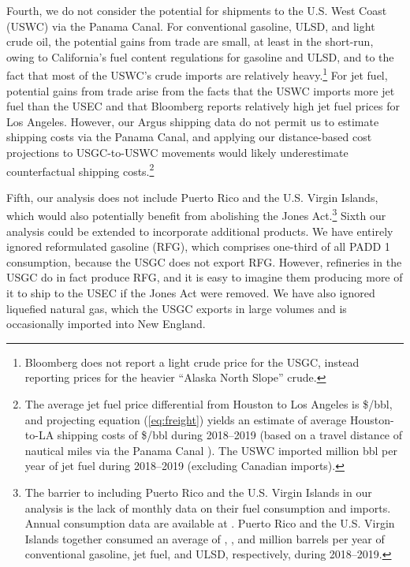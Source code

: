 \documentclass[12pt]{article}
\begin{document}
Fourth, we do not consider the potential for shipments to the U.S. West Coast (USWC) via the Panama Canal. For conventional gasoline, ULSD, and light crude oil, the potential gains from trade are small, at least in the short-run, owing to California's fuel content regulations for gasoline and ULSD, and to the fact that most of the USWC's crude imports are relatively heavy.\footnote{Bloomberg does not report a light crude price for the USGC, instead reporting prices for the heavier ``Alaska North Slope'' crude.} For jet fuel, potential gains from trade arise from the facts that the USWC imports more jet fuel than the USEC and that Bloomberg reports relatively high jet fuel prices for Los Angeles. However, our Argus shipping data do not permit us to estimate shipping costs via the Panama Canal, and applying our distance-based cost projections to USGC-to-USWC movements would likely underestimate counterfactual shipping costs.\footnote{The average jet fuel price differential from Houston to Los Angeles is \$\unskip/bbl, and projecting equation (\ref{eq:freight}) yields an estimate of average Houston-to-LA shipping costs of \$\unskip/bbl during 2018--2019 (based on a travel distance of nautical miles via the Panama Canal \citep{Searoutes2023}). The USWC imported million bbl per year of jet fuel during 2018--2019 (excluding Canadian imports).}

Fifth, our analysis does not include Puerto Rico and the U.S. Virgin Islands, which would also potentially benefit from abolishing the Jones Act.\footnote{The barrier to including Puerto Rico and the U.S. Virgin Islands in our analysis is the lack of monthly data on their fuel consumption and imports. Annual consumption data are available at \cite{EIAintl}. Puerto Rico and the U.S. Virgin Islands together consumed an average of \unskip, \unskip, and million barrels per year of conventional gasoline, jet fuel, and ULSD, respectively, during 2018--2019.} Sixth our analysis could be extended to incorporate additional products. We have entirely ignored reformulated gasoline (RFG), which comprises one-third of all PADD 1 consumption, because the USGC does not export RFG. However, refineries in the USGC do in fact produce RFG, and it is easy to imagine them producing more of it to ship to the USEC if the Jones Act were removed. We have also ignored liquefied natural gas, which the USGC exports in large volumes and is occasionally imported into New England.
\end{document}
